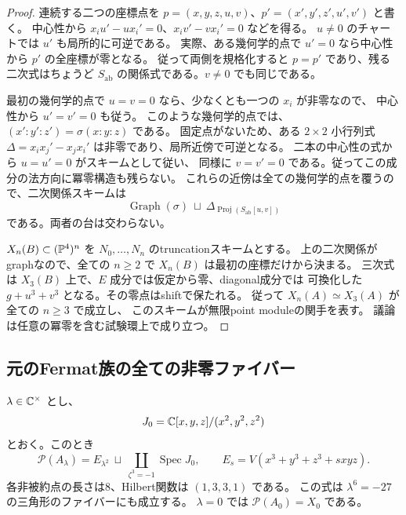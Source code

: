 \begin{proof}
連続する二つの座標点を
$p=(x,y,z,u,v)$、$p'=(x',y',z',u',v')$ と書く。
中心性から $x_iu'-ux_i'=0$、$x_iv'-vx_i'=0$ などを得る。
$u\ne0$ のチャートでは $u'$ も局所的に可逆である。
実際、ある幾何学的点で $u'=0$ なら中心性から $p'$ の全座標が零となる。
従って両側を規格化すると $p=p'$ であり、残る二次式はちょうど
$S_{\mathrm{ab}}$ の関係式である。$v\ne0$ でも同じである。

最初の幾何学的点で $u=v=0$ なら、少なくとも一つの $x_i$ が非零なので、
中心性から $u'=v'=0$ も従う。
このような幾何学的点では、
$(x':y':z')=\sigma(x:y:z)$ である。
固定点がないため、ある $2\times2$ 小行列式
$\Delta=x_ix_j'-x_jx_i'$ は非零であり、局所近傍で可逆となる。
二本の中心性の式から $u=u'=0$ がスキームとして従い、
同様に $v=v'=0$ である。従ってこの成分の法方向に冪零構造も残らない。
これらの近傍は全ての幾何学的点を覆うので、二次関係スキームは
\[
 \operatorname{Graph}(\sigma)\ \sqcup\
 \Delta_{\operatorname{Proj}(S_{\mathrm{ab}}[u,v])}
\]
である。両者の台は交わらない。

$X_n(B)\subset(\mathbb P^4)^n$ を $N_0,\ldots,N_n$ のtruncationスキームとする。
上の二次関係がgraphなので、全ての $n\ge2$ で
$X_n(B)$ は最初の座標だけから決まる。
三次式は $X_3(B)$ 上で、$E$ 成分では仮定から零、diagonal成分では
可換化した $g+u^3+v^3$ となる。その零点はshiftで保たれる。
従って $X_n(A)\simeq X_3(A)$ が全ての $n\ge3$ で成立し、
このスキームが無限point moduleの関手を表す。
議論は任意の冪零を含む試験環上で成り立つ。
\end{proof}

\subsection{元のFermat族の全ての非零ファイバー}

\begin{theorem}\label{thm:point-scheme}
$\lambda\in\mathbb C^\times$ とし、
\[
 J_0=\mathbb C[x,y,z]/(x^2,y^2,z^2)
\]
とおく。このとき
\[
 \boxed{
 \mathscr P(A_\lambda)
 =E_{\lambda^2}\ \sqcup\
 \coprod_{\zeta^3=-1}\operatorname{Spec}J_0
 },\qquad
 E_s=V(x^3+y^3+z^3+sxyz).
\]
各非被約点の長さは8、Hilbert関数は $(1,3,3,1)$ である。
この式は $\lambda^6=-27$ の三角形のファイバーにも成立する。
$\lambda=0$ では $\mathscr P(A_0)=X_0$ である。
\end{theorem}

